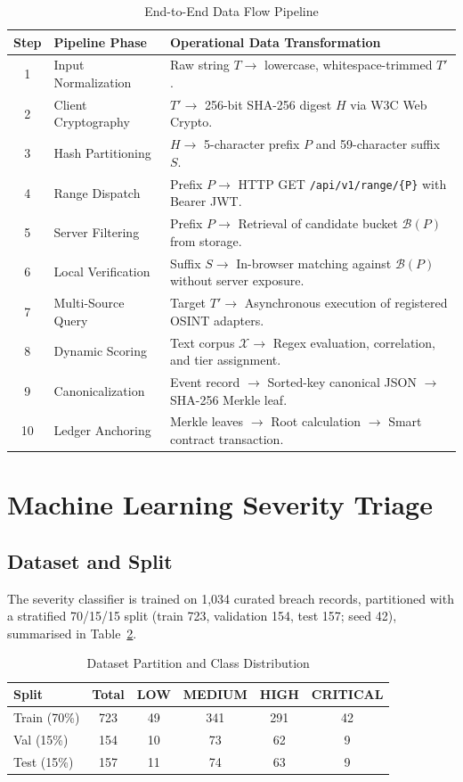 \documentclass[conference]{IEEEtran}
\begin{document}
\begin{table}[htbp]
\caption{End-to-End Data Flow Pipeline}
\label{tab:dataflow}
\centering
\scriptsize
\begin{tabular}{clp{5.4cm}}
\toprule
\textbf{Step} & \textbf{Pipeline Phase} & \textbf{Operational Data Transformation} \\
\midrule
1 & Input Normalization & Raw string $T \to$ lowercase, whitespace-trimmed $T'$. \\
2 & Client Cryptography & $T' \to$ 256-bit SHA-256 digest $H$ via W3C Web Crypto. \\
3 & Hash Partitioning & $H \to$ 5-character prefix $P$ and 59-character suffix $S$. \\
4 & Range Dispatch & Prefix $P \to$ HTTP GET \texttt{/api/v1/range/\{P\}} with Bearer JWT. \\
5 & Server Filtering & Prefix $P \to$ Retrieval of candidate bucket $\mathcal{B}(P)$ from storage. \\
6 & Local Verification & Suffix $S \to$ In-browser matching against $\mathcal{B}(P)$ without server exposure. \\
7 & Multi-Source Query & Target $T' \to$ Asynchronous execution of registered OSINT adapters. \\
8 & Dynamic Scoring & Text corpus $\mathcal{X} \to$ Regex evaluation, correlation, and tier assignment. \\
9 & Canonicalization & Event record $\to$ Sorted-key canonical JSON $\to$ SHA-256 Merkle leaf. \\
10 & Ledger Anchoring & Merkle leaves $\to$ Root calculation $\to$ Smart contract transaction. \\
\bottomrule
\end{tabular}
\end{table}

\section{Machine Learning Severity Triage}
\label{sec:ml}

\subsection{Dataset and Split}
The severity classifier is trained on 1,034 curated breach records, partitioned with a stratified 70/15/15 split (train 723, validation 154, test 157; seed 42), summarised in Table~\ref{tab:split}.

\begin{table}[htbp]
\caption{Dataset Partition and Class Distribution}
\label{tab:split}
\centering
\scriptsize
\begin{tabular}{lccccc}
\toprule
\textbf{Split} & \textbf{Total} & \textbf{LOW} & \textbf{MEDIUM} & \textbf{HIGH} & \textbf{CRITICAL} \\
\midrule
Train (70\%) & 723 & 49 & 341 & 291 & 42 \\
Val (15\%) & 154 & 10 & 73 & 62 & 9 \\
Test (15\%) & 157 & 11 & 74 & 63 & 9 \\
\bottomrule
\end{tabular}
\end{table}
\end{document}
